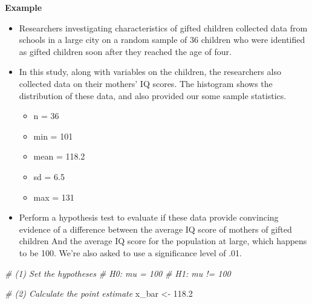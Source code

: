 \documentclass[]{book}
\newenvironment{Shaded}{\begin{snugshade}}{\end{snugshade}}
\newcommand{\CommentTok}[1]{\textcolor[rgb]{0.56,0.35,0.01}{\textit{#1}}}
\newcommand{\FloatTok}[1]{\textcolor[rgb]{0.00,0.00,0.81}{#1}}
\newcommand{\NormalTok}[1]{#1}
\newcommand{\StringTok}[1]{\textcolor[rgb]{0.31,0.60,0.02}{#1}}
\providecommand{\tightlist}{%
  \setlength{\itemsep}{0pt}\setlength{\parskip}{0pt}}
\begin{document}
\textbf{Example}

\begin{itemize}
\tightlist
\item
  Researchers investigating characteristics of gifted children collected data from schools in a large city on a random sample of 36 children who were identified as gifted children soon after they reached the age of four.
\item
  In this study, along with variables on the children, the researchers also collected data on their mothers' IQ scores. The histogram shows the distribution of these data, and also provided our some sample statistics.

  \begin{itemize}
  \tightlist
  \item
    n = 36
  \item
    min = 101
  \item
    mean = 118.2
  \item
    sd = 6.5
  \item
    max = 131
  \end{itemize}
\item
  Perform a hypothesis test to evaluate if these data provide convincing evidence of a difference between the average IQ score of mothers of gifted children And the average IQ score for the population at large, which happens to be 100. We're also asked to use a significance level of .01.
\end{itemize}

\begin{Shaded}
\begin{Highlighting}[]
\CommentTok{# (1) Set the hypotheses}
\CommentTok{# H0: mu = 100}
\CommentTok{# H1: mu != 100}
\end{Highlighting}
\end{Shaded}

\begin{Shaded}
\begin{Highlighting}[]
\CommentTok{# (2) Calculate the point estimate}
\NormalTok{x_bar <-}\StringTok{ }\FloatTok{118.2}
\end{Highlighting}
\end{Shaded}

\begin{Shaded}
\end{Shaded}
\end{document}
